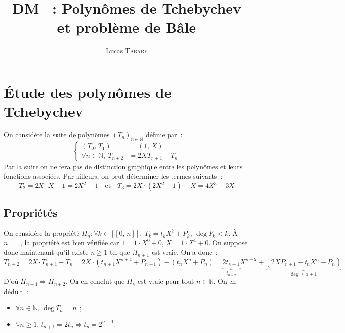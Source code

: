 \documentclass{article}
\title{\textbf{DM \No 11~: Polynômes de Tchebychev et problème de Bâle}}
\author{Lucas \textsc{Tabary}}
\date{}
\begin{document}
  \maketitle
  \hrulefill

  \vspace{1.2cm}
  \hrulefill

  \section{Étude des polynômes de Tchebychev}

  On considère la suite de polynômes $(T_n)_{n\in\mathbb{N}}$ définie par~:
  \[
  \left\{\begin{aligned}
      (T_0,\, T_1) &= (1,\, X) \\
      \forall n\in\mathbb{N},\ T_{n+2} &= 2XT_{n+1} - T_n
  \end{aligned}
  \right.
  \]
  Par la suite on ne fera pas de distinction graphique entre les polynômes et leurs fonctions associées. Par ailleurs, on peut déterminer les termes suivants~:
  \[
    T_2 = 2X\cdot X - 1 = 2X^2 - 1
    \quad \mbox{et} \quad
    T_3 = 2X \cdot (2X^2 - 1) - X = 4X^3 - 3X
  \]

  \subsection{Propriétés}
  On considère la propriété $H_n\colon \forall k\in[\![0,\, n]\!],\ T_k = t_k X^k + P_k,\ \deg P_k < k$. À $n = 1$, la propriété est bien vérifiée car $1 = 1\cdot X^0 + 0$, $X = 1\cdot X^1 + 0$. On suppose donc maintenant qu'il existe $n \geqslant 1$ tel que $H_{n+1}$ est vraie. On a donc~:
  \[
    T_{n+2} = 2X\cdot T_{n+1} - T_n = 2X\cdot(t_{n+1} X^{n+1} + P_{n+1}) - (t_n X^n + P_n) = \underbrace{2t_{n+1}}_{t_{n+2}} X^{n+2} + \underbrace{(2XP_{n+1} - t_nX^n - P_n)}_{\deg \leqslant n + 1}
  \]
  D'où $H_{n+1}\Longrightarrow H_{n+2}$. On en conclut que $H_n$ est vraie pour tout $n\in\mathbb{N}$. On en déduit~:
  \begin{itemize}
    \item $\forall n\in\mathbb{N},\ \deg T_n = n$~;
    \item $\forall n \geqslant 1,\ t_{n+1} = 2t_n \Longrightarrow t_n = 2^{n-1}$.
  \end{itemize}
\end{document}
